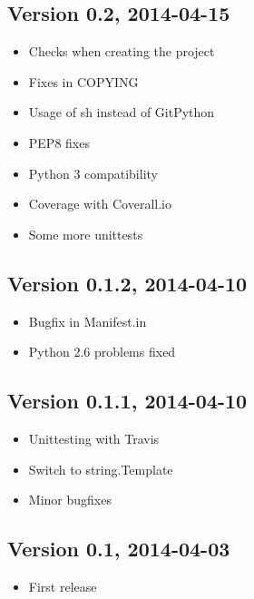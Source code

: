 \documentclass[letterpaper,10pt,english]{sphinxmanual}
\begin{document}
\subsection{Version 0.2, 2014-04-15}
\label{changes:version-0-2-2014-04-15}\begin{itemize}
\item {} 
Checks when creating the project

\item {} 
Fixes in COPYING

\item {} 
Usage of sh instead of GitPython

\item {} 
PEP8 fixes

\item {} 
Python 3 compatibility

\item {} 
Coverage with Coverall.io

\item {} 
Some more unittests

\end{itemize}


\subsection{Version 0.1.2, 2014-04-10}
\label{changes:version-0-1-2-2014-04-10}\begin{itemize}
\item {} 
Bugfix in Manifest.in

\item {} 
Python 2.6 problems fixed

\end{itemize}


\subsection{Version 0.1.1, 2014-04-10}
\label{changes:version-0-1-1-2014-04-10}\begin{itemize}
\item {} 
Unittesting with Travis

\item {} 
Switch to string.Template

\item {} 
Minor bugfixes

\end{itemize}


\subsection{Version 0.1, 2014-04-03}
\label{changes:version-0-1-2014-04-03}\begin{itemize}
\item {} 
First release

\end{itemize}
\end{document}
